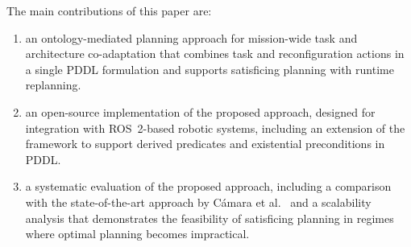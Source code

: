 The main contributions of this paper are:
\begin{enumerate}
    \item an ontology-mediated planning approach for mission-wide task and architecture co-adaptation that combines task and reconfiguration actions in a single PDDL formulation and supports satisficing planning with runtime replanning.
    \item an open-source implementation of the proposed approach, designed for integration with ROS~2-based robotic systems, including an extension of the \plansys framework to support derived predicates and existential preconditions in PDDL\@.
    \item a systematic evaluation of the proposed approach, including a comparison with the state-of-the-art approach by Cámara et al.~\cite{CAMARASoftwareArchitectureTask2020} and a scalability analysis that demonstrates the feasibility of satisficing planning in regimes where optimal planning becomes impractical.
\end{enumerate}


